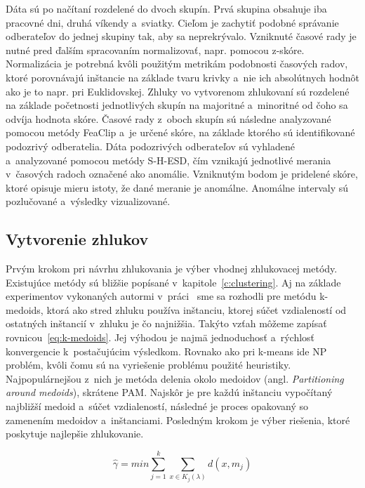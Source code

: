 \documentclass[a4paper,twoside,slovak,12pt,appendix]{article}
\begin{document}
Dáta sú po načítaní rozdelené do dvoch skupín. Prvá skupina obsahuje iba
pracovné dni, druhá víkendy a~sviatky. Cieľom je zachytiť podobné správanie
odberateľov do jednej skupiny tak, aby sa neprekrývalo. Vzniknuté časové rady je
nutné pred ďalším spracovaním normalizovať, napr. pomocou z-skóre. Normalizácia
je potrebná kvôli použitým metrikám podobnosti časových radov, ktoré porovnávajú
inštancie na základe tvaru krivky a~nie ich absolútnych hodnôt ako je to napr.
pri Euklidovskej. Zhluky vo vytvorenom zhlukovaní sú rozdelené na základe
početnosti jednotlivých skupín na majoritné a~minoritné od čoho sa odvíja
hodnota skóre. Časové rady z~oboch skupín sú následne analyzované pomocou metódy
FeaClip a~je určené skóre, na základe ktorého sú identifikované podozrivý
odberatelia. Dáta podozrivých odberateľov sú vyhladené a~analyzované pomocou
metódy S-H-ESD, čím vznikajú jednotlivé merania v~časových radoch označené ako
anomálie. Vzniknutým bodom je pridelené skóre, ktoré opisuje mieru istoty, že
dané meranie je anomálne. Anomálne intervaly sú pozlučované a~výsledky
vizualizované.

\subsection{Vytvorenie zhlukov}
Prvým krokom pri návrhu zhlukovania je výber vhodnej zhlukovacej metódy.
Existujúce metódy sú bližšie popísané v~kapitole~\ref{c:clustering}. Aj na
základe experimentov vykonaných autormi v~práci~\cite{PhDLaurinec2018} sme sa
rozhodli pre metódu k-medoids, ktorá ako stred zhluku používa inštanciu, ktorej
súčet vzdialeností od ostatných inštancií v~zhluku je čo najnižšia. Takýto
vzťah môžeme zapísať rovnicou~\ref{eq:k-medoids}. Jej výhodou je najmä
jednoduchosť a~rýchlosť konvergencie k~postačujúcim výsledkom. Rovnako ako pri
k-means ide NP problém, kvôli čomu sú na vyriešenie problému použité heuristiky.
Najpopulárnejšou z~nich je metóda delenia okolo medoidov (angl.
\textit{Partitioning around medoids}), skrátene PAM. Najskôr je pre každú
inštanciu vypočítaný najbližší medoid a~súčet vzdialeností, následné je proces
opakovaný so zamenením medoidov a~inštanciami. Posledným krokom je výber
riešenia, ktoré poskytuje najlepšie zhlukovanie.

\begin{equation}
  \label{eq:k-medoids}
  \hat{\gamma} = min \sum_{j=1}^{k} \sum_{x \in K_j(\lambda)} d(x, m_j)
\end{equation}
\end{document}
